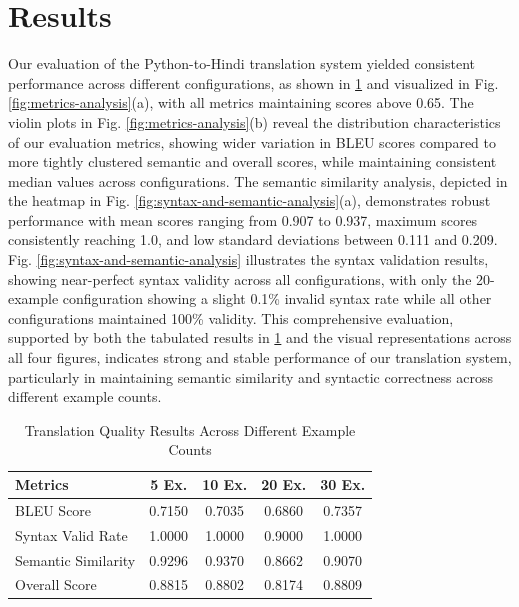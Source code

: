 \documentclass[11pt,a4paper]{article}
\begin{document}
\section{Results}
Our evaluation of the Python-to-Hindi translation system yielded consistent performance across different configurations, as shown in \ref{tab:translation-results} and visualized in Fig. \ref{fig:metrics-analysis}(a), with all metrics maintaining scores above 0.65. The violin plots in Fig.  \ref{fig:metrics-analysis}(b) reveal the distribution characteristics of our evaluation metrics, showing wider variation in BLEU scores compared to more tightly clustered semantic and overall scores, while maintaining consistent median values across configurations. The semantic similarity analysis, depicted in the heatmap in Fig. \ref{fig:syntax-and-semantic-analysis}(a), demonstrates robust performance with mean scores ranging from 0.907 to 0.937, maximum scores consistently reaching 1.0, and low standard deviations between 0.111 and 0.209. Fig. \ref{fig:syntax-and-semantic-analysis} illustrates the syntax validation results, showing near-perfect syntax validity across all configurations, with only the 20-example configuration showing a slight 0.1\% invalid syntax rate while all other configurations maintained 100\% validity. This comprehensive evaluation, supported by both the tabulated results in \ref{tab:translation-results} and the visual representations across all four figures, indicates strong and stable performance of our translation system, particularly in maintaining semantic similarity and syntactic correctness across different example counts.
\begin{table}[htbp]
    \small  %
    \centering
    \caption{Translation Quality Results Across Different Example Counts}
    \begin{tabular}{|l|c|c|c|c|}
    \hline
    \textbf{Metrics} & \textbf{5 Ex.} & \textbf{10 Ex.} & \textbf{20 Ex.} & \textbf{30 Ex.} \\
    \hline
    BLEU Score & 0.7150 & 0.7035 & 0.6860 & 0.7357 \\
    \hline
    Syntax Valid Rate & 1.0000 & 1.0000 & 0.9000 & 1.0000 \\
    \hline
    Semantic Similarity & 0.9296 & 0.9370 & 0.8662 & 0.9070 \\
    \hline
    Overall Score & 0.8815 & 0.8802 & 0.8174 & 0.8809 \\
    \hline
    \end{tabular}
    \label{tab:translation-results}
    \end{table}
\end{document}
